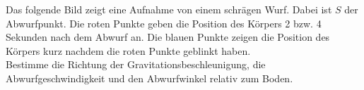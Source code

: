 \begin{Exercise}[label = throwim1, difficulty = 3, origin = Aaron Wild, title = Schräger Wurf]
	Das folgende Bild zeigt eine Aufnahme von einem schrägen Wurf. Dabei ist $S$ der Abwurfpunkt. Die roten Punkte geben die Position des Körpers 2 bzw. 4 Sekunden nach dem Abwurf an. Die blauen Punkte zeigen die Position des Körpers kurz nachdem die roten Punkte geblinkt haben.\\
	Bestimme die Richtung der Gravitationsbeschleunigung, die Abwurfgeschwindigkeit und den Abwurfwinkel relativ zum Boden.
\end{Exercise}
\begin{figure}[h]
	\centering
	
\end{figure}
